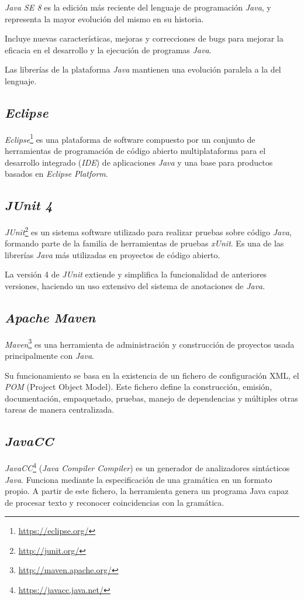 \textit{Java SE 8} es la edición más reciente del lenguaje de programación \textit{Java}, y representa la mayor evolución del mismo en su historia.

Incluye nuevas características, mejoras y correcciones de bugs para mejorar la eficacia en el desarrollo y la ejecución de programas \textit{Java}. 
 
Las librerías de la plataforma \textit{Java} mantienen una evolución paralela a la del lenguaje.

\subsection{\textit{Eclipse}}
\textit{Eclipse}\footnote{\url{https://eclipse.org/}} es una plataforma de software compuesto por un conjunto de herramientas de programación de código abierto multiplataforma para el desarrollo integrado (\textit{IDE}) de aplicaciones \textit{Java}  y una base para productos basados en \textit{Eclipse Platform}.


\subsection{\textit{JUnit 4}}
\textit{JUnit}\footnote{\url{http://junit.org/}} es un sistema software utilizado para realizar pruebas sobre código \textit{Java}, formando parte de la familia de herramientas de pruebas \textit{xUnit}.
Es una de las librerías \textit{Java} más utilizadas en proyectos de código abierto.

La versión 4 de \textit{JUnit} extiende y simplifica la funcionalidad de anteriores versiones, haciendo un uso extensivo del sistema de anotaciones de \textit{Java}.


\subsection{\textit{Apache Maven}}
\textit{Maven}\footnote{\url{http://maven.apache.org/}} es una herramienta de administración y construcción de proyectos usada principalmente con \textit{Java}.

Su funcionamiento se basa en la existencia de un fichero de configuración XML, el \textit{POM} (Project Object Model).
Este fichero define la construcción, emisión, documentación, empaquetado, pruebas, manejo de dependencias y múltiples otras tareas de manera centralizada.

\subsection{\textit{JavaCC}}
\textit{JavaCC}\footnote{\url{https://javacc.java.net/}} (\emph{Java Compiler Compiler}) es un generador de analizadores sintácticos \textit{Java}.
Funciona mediante la especificación de una gramática en un formato propio.
A partir de este fichero, la herramienta genera un programa Java capaz de procesar texto y reconocer coincidencias con la gramática.

